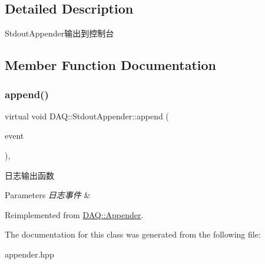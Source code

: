 \subsection{Detailed Description}
Stdout\+Appender输出到控制台 

\subsection{Member Function Documentation}
\mbox{\label{classDAQ_1_1StdoutAppender_a012a068aa3532d7f1b3459ff11107231}} 
\subsubsection{\texorpdfstring{append()}{append()}}
{\footnotesize\ttfamily virtual void D\+A\+Q\+::\+Stdout\+Appender\+::append (\begin{DoxyParamCaption}\item[{Log\+Event\+::sptr}]{event }\end{DoxyParamCaption})\hspace{0.3cm}{\ttfamily [override]}, {\ttfamily [virtual]}}



日志输出函数 


\begin{DoxyParams}{Parameters}
{\em 日志事件} & \\
\hline
\end{DoxyParams}


Reimplemented from \hyperlink{classDAQ_1_1Appender_a49ebbcec4d879ba461080479fa1085aa}{D\+A\+Q\+::\+Appender}.



The documentation for this class was generated from the following file\+:\begin{DoxyCompactItemize}
\item 
appender.\+hpp\end{DoxyCompactItemize}
